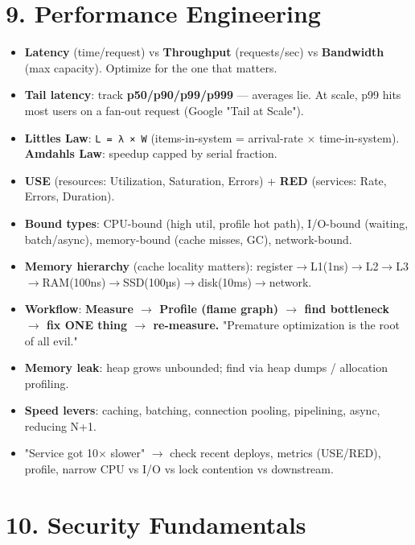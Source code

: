 \documentclass[11pt]{article}
\providecommand{\tightlist}{\setlength{\itemsep}{1pt}\setlength{\parskip}{0pt}}
\begin{document}
\section{9. Performance Engineering}\label{9-performance-engineering}

\begin{itemize}
\tightlist
\item
  \textbf{Latency} (time/request) vs \textbf{Throughput} (requests/sec) vs \textbf{Bandwidth} (max capacity). Optimize for the one that matters.
\item
  \textbf{Tail latency}: track \textbf{p50/p90/p99/p999} --- averages lie. At scale, p99 hits most users on a fan-out request (Google "Tail at Scale").
\item
  \textbf{Little\textquotesingle s Law}: \texttt{L\ =\ λ\ ×\ W} (items-in-system = arrival-rate \(\times\) time-in-system). \textbf{Amdahl\textquotesingle s Law}: speedup capped by serial fraction.
\item
  \textbf{USE} (resources: Utilization, Saturation, Errors) + \textbf{RED} (services: Rate, Errors, Duration).
\item
  \textbf{Bound types}: CPU-bound (high util, profile hot path), I/O-bound (waiting, batch/async), memory-bound (cache misses, GC), network-bound.
\item
  \textbf{Memory hierarchy} (cache locality matters): register\(\rightarrow\)L1(1ns)\(\rightarrow\)L2\(\rightarrow\)L3\(\rightarrow\)RAM(100ns)\(\rightarrow\)SSD(100µs)\(\rightarrow\)disk(10ms)\(\rightarrow\)network.
\item
  \textbf{Workflow}: \textbf{Measure \(\rightarrow\) Profile (flame graph) \(\rightarrow\) find bottleneck \(\rightarrow\) fix ONE thing \(\rightarrow\) re-measure.} "Premature optimization is the root of all evil."
\item
  \textbf{Memory leak}: heap grows unbounded; find via heap dumps / allocation profiling.
\item
  \textbf{Speed levers}: caching, batching, connection pooling, pipelining, async, reducing N+1.
\item
  "Service got 10\(\times\) slower" \(\rightarrow\) check recent deploys, metrics (USE/RED), profile, narrow CPU vs I/O vs lock contention vs downstream.
\end{itemize}

\section{10. Security Fundamentals}\label{10-security-fundamentals}
\end{document}
